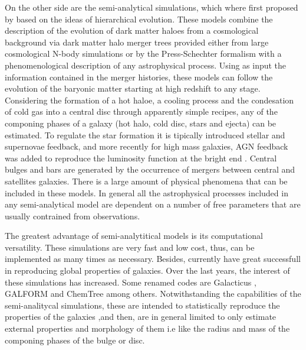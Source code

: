 \documentclass[usenatbib]{mn2e}
\begin{document}
On the other side are the semi-analytical simulations, which where first proposed by \cite{1991ApJ...379...52W} based on the ideas of hierarchical evolution. These models combine the description of 
the evolution of dark matter haloes from a cosmological background via dark matter halo merger trees provided either from large cosmological N-body simulations or by the Press-Schechter formalism 
\citep{1974ApJ...187..425P} with a phenomenological description of any astrophysical process. Using as input the information contained in the merger histories, these models can follow the evolution of the 
baryonic matter starting at high redshift to any stage. Considering the formation of a hot haloe, a cooling process and the condesation of cold gas into a central disc through apparently simple recipes,
any of the componing phases of a galaxy (hot halo, cold disc, stars and ejecta) can be estimated. To regulate the star formation it is tipically introduced stellar and supernovae feedback, and more recently
for high mass galaxies, AGN feedback was added to reproduce the luminosity function at the bright end \citep{2006MNRAS.365...11C}.  Central bulges and bars are generated by the occurrence of mergers  between 
central and satellites galaxies. There is a large amount of physical phenomena that can be included in these models.  In general all the astrophysical processes included in any semi-analytical model are dependent 
on a number of free parameters that are usually contrained from observations. 

The greatest advantage of semi-analytitical models is its  computational versatility. These simulations are very fast and low cost, thus, can be implemented as many times as necessary. Besides, currently have 
great successfull in reproducing global properties of galaxies. Over the last years, the interest of these simulations has increased. Some renamed codes are  Galacticus \citep{2010arXiv1008.1786B}, GALFORM
\citep{2010MNRAS.405.1573B} and ChemTree \citep{2006ApJ...641....1T} among others. Notwithstanding the capabilities of the semi-analitycal simulations, these are intended to statistically reproduce  
the properties of the galaxies ,and then, are in general limited  to only estimate external properties and morphology of them i.e like the radius and mass of the componing phases of the 
bulge or disc. 
\end{document}
